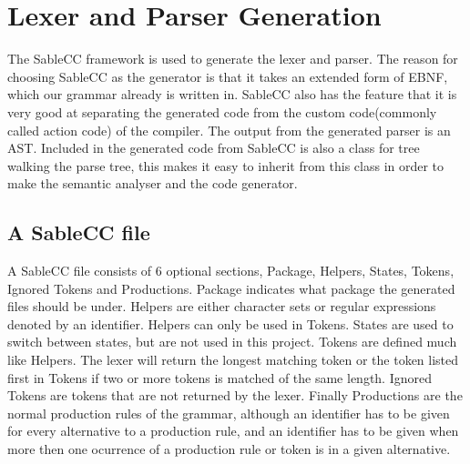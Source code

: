 \chapter{Lexer and Parser Generation}

The SableCC framework is used to generate the lexer and parser. The reason for choosing SableCC as the generator is that it takes an extended form of EBNF, which our grammar already is written in. SableCC also has the feature that it is very good at separating the generated code from the custom code(commonly called action code) of the compiler. The output from the generated parser is an AST. Included in the generated code from SableCC is also a class for tree walking the parse tree, this makes it easy to inherit  from this class in order to make the semantic analyser and the code generator. 

\section{A SableCC file}
A SableCC file consists of 6 optional sections, Package, Helpers, States, Tokens, Ignored Tokens and Productions.
Package indicates what package the generated files should be under. Helpers are either character sets or regular expressions denoted by an identifier. Helpers can only be used in Tokens. States are used to switch between states, but are not used in this project. Tokens are defined much like Helpers. The lexer will return the longest matching token or the token listed first in Tokens if two or more tokens is matched of the same length. Ignored Tokens are tokens that are not returned by the lexer. Finally Productions are the normal production rules of the grammar, although an identifier has to be given for every alternative to a production rule, and an identifier has to be given when more then one ocurrence of a production rule or token is in a given alternative.